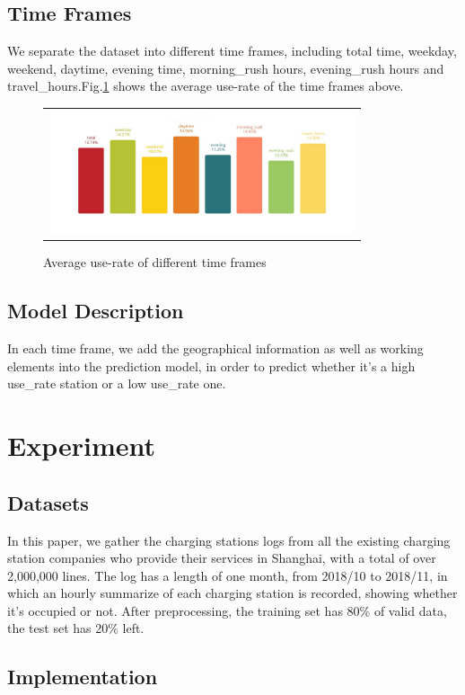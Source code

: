 \documentclass[conference]{IEEEtran}
\begin{document}
\subsection{Time Frames}
We separate the dataset into different time frames, including total time, weekday, weekend, daytime, evening time, morning\_rush hours, evening\_rush hours and travel\_hours.Fig.\ref{fig3} shows the average use-rate of the time frames above.
\begin{figure}[htbp]
	\begin{tabular}{l}
		\includegraphics[width=90mm]{timeframes.pdf}
	\end{tabular}
	\centering
	\caption{Average use-rate of different time frames}
	\label{fig3}
\end{figure}

\subsection{Model Description}
In each time frame, we add the geographical information as well as working elements into the prediction model, in order to predict whether it’s a high use\_rate station or a low use\_rate one.
\section{Experiment}

\subsection{Datasets}
In this paper, we gather the charging stations logs from all the existing charging station companies who provide their services in Shanghai, with a total of over 2,000,000 lines. The log has a length of one month, from 2018/10 to 2018/11, in which an hourly summarize of each charging station is recorded, showing whether it's occupied or not. After preprocessing, the training set has 80\% of valid data, the test set has 20\% left.

\subsection{Implementation}
\end{document}
